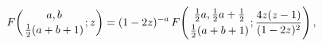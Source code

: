 \[\mathop{F\/}\nolimits\!\left({a,b\atop\frac{1}{2}(a+b+1)};z\right)=(1-2z)^{-a}%
\mathop{F\/}\nolimits\!\left({\frac{1}{2}a,\frac{1}{2}a+\frac{1}{2}\atop\frac{%
1}{2}(a+b+1)};\frac{4z(z-1)}{(1-2z)^{2}}\right),\]